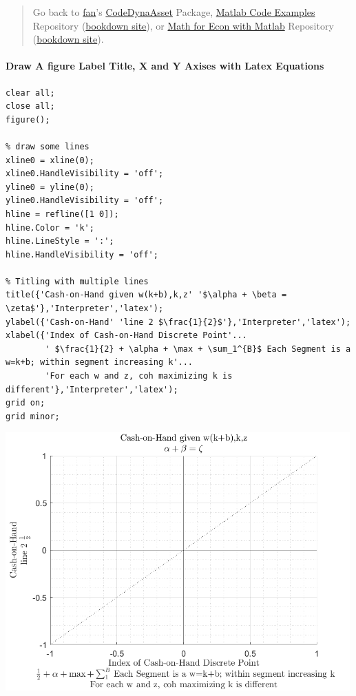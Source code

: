 \documentclass[
]{book}
\begin{document}
\begin{quote}
Go back to \href{http://fanwangecon.github.io/}{fan}'s \href{https://fanwangecon.github.io/CodeDynaAsset/}{CodeDynaAsset} Package, \href{https://fanwangecon.github.io/M4Econ/}{Matlab Code Examples} Repository (\href{https://fanwangecon.github.io/M4Econ/bookdown}{bookdown site}), or \href{https://fanwangecon.github.io/Math4Econ/}{Math for Econ with Matlab} Repository (\href{https://fanwangecon.github.io/Math4Econ/bookdown}{bookdown site}).
\end{quote}

\hypertarget{draw-a-figure-label-title-x-and-y-axises-with-latex-equations}{%
\paragraph{\texorpdfstring{\textbf{Draw A figure Label Title, X and Y Axises with Latex Equations}}{Draw A figure Label Title, X and Y Axises with Latex Equations}}\label{draw-a-figure-label-title-x-and-y-axises-with-latex-equations}}

\begin{verbatim}
clear all;
close all;
figure();

% draw some lines
xline0 = xline(0);
xline0.HandleVisibility = 'off';
yline0 = yline(0);
yline0.HandleVisibility = 'off';
hline = refline([1 0]);
hline.Color = 'k';
hline.LineStyle = ':';
hline.HandleVisibility = 'off';

% Titling with multiple lines
title({'Cash-on-Hand given w(k+b),k,z' '$\alpha + \beta = \zeta$'},'Interpreter','latex');
ylabel({'Cash-on-Hand' 'line 2 $\frac{1}{2}$'},'Interpreter','latex');
xlabel({'Index of Cash-on-Hand Discrete Point'...
        ' $\frac{1}{2} + \alpha + \max + \sum_1^{B}$ Each Segment is a w=k+b; within segment increasing k'...
        'For each w and z, coh maximizing k is different'},'Interpreter','latex');
grid on;
grid minor;
\end{verbatim}

\includegraphics[width=5.20833in,height=\textheight]{img/fs_titling_images/figure_0.png}
\end{document}
